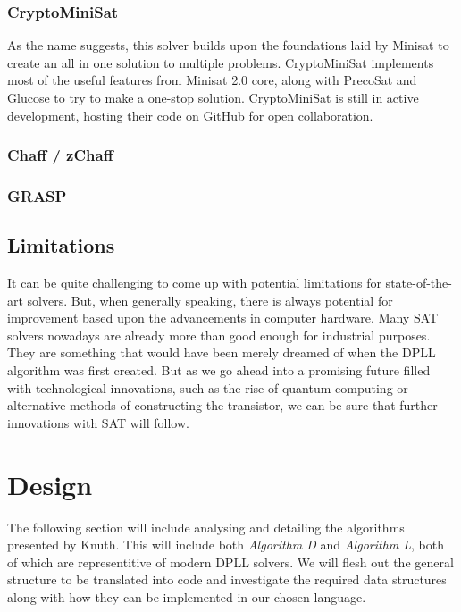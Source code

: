 \documentclass{article}
\begin{document}
\subsubsection{CryptoMiniSat}
As the name suggests, this solver builds upon the foundations laid by Minisat to create an all in
one solution to multiple problems. CryptoMiniSat implements most of the useful features from Minisat
2.0 core, along with PrecoSat and Glucose to try to make a one-stop solution. CryptoMiniSat is still
in active development, hosting their code on GitHub for open collaboration.

\subsubsection{Chaff / zChaff}
\lipsum[2-3]
\subsubsection{GRASP}
\lipsum[2-3]

\subsection{Limitations}
It can be quite challenging to come up with potential limitations for state-of-the-art solvers. But, when generally speaking,
there is always potential for improvement based upon the advancements in computer hardware. Many SAT solvers nowadays are already
more than good enough for industrial purposes. They are something that would have been merely dreamed of when the DPLL algorithm
was first created. But as we go ahead into a promising future filled with technological innovations, such as the rise of quantum
computing or alternative methods of constructing the transistor, we can be sure that further innovations with SAT will follow.

\section{Design}
The following section will include analysing and detailing the algorithms presented by Knuth. This will include both
\textit{Algorithm D} and \textit{Algorithm L}, both of which are representitive of modern DPLL solvers. We will flesh out the
general structure to be translated into code and investigate the required data structures along with how they can be implemented
in our chosen language.
\end{document}
